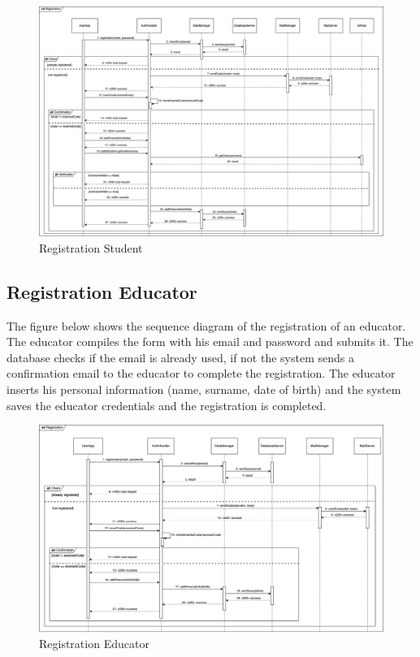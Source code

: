 \begin{figure}[H]
    \centering
    \includegraphics[width=1\textwidth]{images/seq_diagrams/RegistrationStd_DD.png}
    \caption{Registration Student}
\end{figure}

\subsection{Registration Educator}
The figure below shows the sequence diagram of the registration of an educator. The educator compiles the form with his email and password and submits it. 
The database checks if the email is already used, if not the system sends a confirmation email to the educator to complete the registration. 
The educator inserts his personal information (name, surname, date of birth) and the system saves the educator credentials and the registration is completed.
\begin{figure}[H]
    \centering
    \includegraphics[width=1\textwidth]{images/seq_diagrams/RegistrationEd_DD.png}
    \caption{Registration Educator}
\end{figure}


